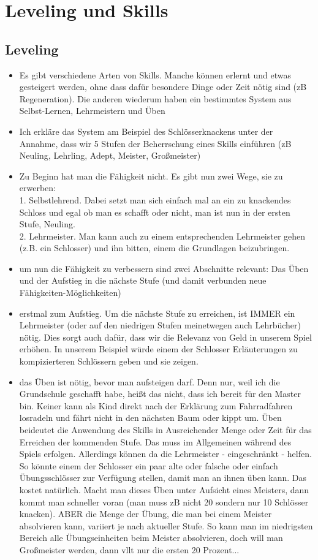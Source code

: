 \chapter{Leveling und Skills}
\section{Leveling}
\begin{itemize}
	\item Es gibt verschiedene Arten von Skills. Manche können erlernt und etwas gesteigert werden, ohne dass dafür besondere Dinge oder Zeit nötig sind (zB Regeneration). Die anderen wiederum haben ein bestimmtes System aus Selbst-Lernen, Lehrmeistern und Üben
	\item Ich erkläre das System am Beispiel des Schlösserknackens unter der Annahme, dass wir 5 Stufen der Beherrschung eines Skills einführen (zB Neuling, Lehrling, Adept, Meister, Großmeister)
	\item Zu Beginn hat man die Fähigkeit nicht. Es gibt nun zwei Wege, sie zu erwerben:\\
	1. Selbstlehrend. Dabei setzt man sich einfach mal an ein zu knackendes Schloss und egal ob man es schafft oder nicht, man ist nun in der ersten Stufe, Neuling. \\
	2. Lehrmeister. Man kann auch zu einem entsprechenden Lehrmeister gehen (z.B. ein Schlosser) und ihn bitten, einem die Grundlagen beizubringen.
	\item um nun die Fähigkeit zu verbessern sind zwei Abschnitte relevant: Das Üben und der Aufstieg in die nächste Stufe (und damit verbunden neue Fähigkeiten-Möglichkeiten)
	\item erstmal zum Aufstieg. Um die nächste Stufe zu erreichen, ist IMMER ein Lehrmeister (oder auf den niedrigen Stufen meinetwegen auch Lehrbücher) nötig. Dies sorgt auch dafür, dass wir die Relevanz von Geld in unserem Spiel erhöhen.
	In unserem Beispiel würde einem der Schlosser Erläuterungen zu kompizierteren Schlössern geben und sie zeigen.
	\item das Üben ist nötig, bevor man aufsteigen darf. Denn nur, weil ich die Grundschule geschafft habe, heißt das nicht, dass ich bereit für den Master bin. Keiner kann als Kind direkt nach der Erklärung zum Fahrradfahren losradeln und fährt nicht in den nächsten Baum oder kippt um.
	Üben beideutet die Anwendung des Skills in Ausreichender Menge oder Zeit für das Erreichen der kommenden Stufe. Das muss im Allgemeinen während des Spiels erfolgen. Allerdings können da die Lehrmeister - eingeschränkt - helfen. So könnte einem der Schlosser ein paar alte oder falsche oder einfach Übungsschlösser zur Verfügung stellen, damit man an ihnen üben kann. Das kostet natürlich. Macht man dieses Üben unter Aufsicht eines Meisters, dann kommt man schneller voran (man muss zB nicht 20 sondern nur 10 Schlösser knacken). ABER die Menge der Übung, die man bei einem Meister absolvieren kann, variiert je nach aktueller Stufe. So kann man im niedrigsten Bereich alle Übungseinheiten beim Meister absolvieren, doch will man Großmeister werden, dann vllt nur die ersten 20 Prozent...

\end{itemize}
